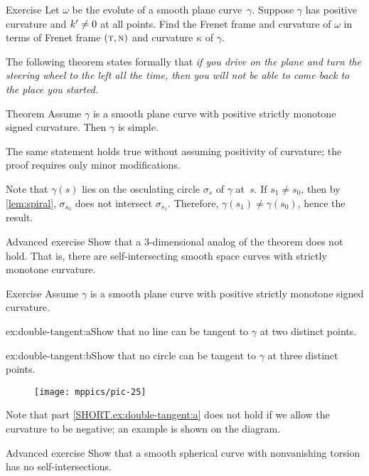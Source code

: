 \begin{thm}{Exercise}\label{ex:evolute}
Let $\omega$ be the evolute of a smooth plane curve~$\gamma$.
Suppose $\gamma$ has positive curvature and $k ^{\prime} \neq 0$ at all points.
Find the Frenet frame and curvature of \(\omega\) in terms of Frenet frame $(\text{\sc{t}},\text{\sc{n}})$ and curvature $\kappa$ of \(\gamma\).
\end{thm}

The following theorem states formally that 
\textit{if you drive on the plane and turn the steering wheel to the left all the time,
then you will not be able to come back to the place you started.}


\begin{thm}{Theorem}\label{thm:spiral}
Assume $\gamma$ is a smooth plane curve with positive strictly monotone signed curvature. 
Then $\gamma$ is simple.
\end{thm}

The same statement holds true without assuming positivity of curvature; the proof requires only minor modifications.

Note that $\gamma(s)$ lies on the osculating circle $\sigma_s$ of $\gamma$ at~$s$.
If $s_1\ne s_0$, then by \ref{lem:spiral}, $\sigma_{s_0}$ does not intersect $\sigma_{s_1}$.
Therefore, $\gamma(s_1)\ne \gamma(s_0)$,
hence the result.\qeds

\begin{thm}{Advanced exercise}\label{ex:3D-spiral}
Show that a 3-dimensional analog of the theorem does not hold.
That is, there are self-intersecting smooth space curves with strictly monotone curvature.
\end{thm}

\begin{thm}{Exercise}\label{ex:double-tangent}
Assume $\gamma$ is a smooth plane curve with positive strictly monotone signed curvature.

\begin{subthm}{ex:double-tangent:a}Show that no line can be tangent to $\gamma$ at two distinct points.
\end{subthm}

\begin{subthm}{ex:double-tangent:b}Show that no circle can be tangent to $\gamma$ at three distinct points. 
\end{subthm}

\end{thm}

{

\begin{wrapfigure}{o}{25 mm}
\vskip-4mm
\centering
\texttt{[image: mppics/pic-25]}
\vskip0mm
\end{wrapfigure}

Note that part \ref{SHORT.ex:double-tangent:a} does not hold if we allow the curvature to be negative; an example is shown on the diagram.

}

\begin{thm}{Advanced exercise}\label{ex:spherical-spiral}
Show that a smooth spherical curve with nonvanishing torsion has no self-intersections.
\end{thm}


